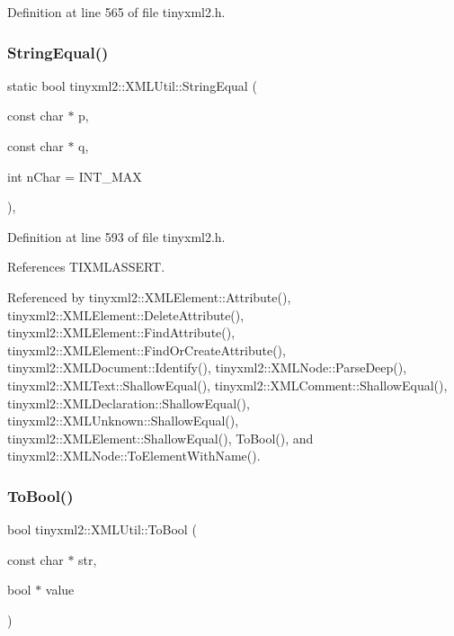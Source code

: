 Definition at line 565 of file tinyxml2.\+h.

\mbox{\label{classtinyxml2_1_1_x_m_l_util_acfcd287cacfd2533e1bc9ea4dfb56602}} 
\subsubsection{StringEqual()}
{\footnotesize\ttfamily static bool tinyxml2\+::\+X\+M\+L\+Util\+::\+String\+Equal (\begin{DoxyParamCaption}\item[{const char $\ast$}]{p,  }\item[{const char $\ast$}]{q,  }\item[{int}]{n\+Char = {\ttfamily INT\+\_\+MAX} }\end{DoxyParamCaption})\hspace{0.3cm}{\ttfamily [inline]}, {\ttfamily [static]}}



Definition at line 593 of file tinyxml2.\+h.



References T\+I\+X\+M\+L\+A\+S\+S\+E\+RT.



Referenced by tinyxml2\+::\+X\+M\+L\+Element\+::\+Attribute(), tinyxml2\+::\+X\+M\+L\+Element\+::\+Delete\+Attribute(), tinyxml2\+::\+X\+M\+L\+Element\+::\+Find\+Attribute(), tinyxml2\+::\+X\+M\+L\+Element\+::\+Find\+Or\+Create\+Attribute(), tinyxml2\+::\+X\+M\+L\+Document\+::\+Identify(), tinyxml2\+::\+X\+M\+L\+Node\+::\+Parse\+Deep(), tinyxml2\+::\+X\+M\+L\+Text\+::\+Shallow\+Equal(), tinyxml2\+::\+X\+M\+L\+Comment\+::\+Shallow\+Equal(), tinyxml2\+::\+X\+M\+L\+Declaration\+::\+Shallow\+Equal(), tinyxml2\+::\+X\+M\+L\+Unknown\+::\+Shallow\+Equal(), tinyxml2\+::\+X\+M\+L\+Element\+::\+Shallow\+Equal(), To\+Bool(), and tinyxml2\+::\+X\+M\+L\+Node\+::\+To\+Element\+With\+Name().

\mbox{\label{classtinyxml2_1_1_x_m_l_util_ae5b03e0a1ca5d42052a7ac540f7aa12a}} 
\subsubsection{ToBool()}
{\footnotesize\ttfamily bool tinyxml2\+::\+X\+M\+L\+Util\+::\+To\+Bool (\begin{DoxyParamCaption}\item[{const char $\ast$}]{str,  }\item[{bool $\ast$}]{value }\end{DoxyParamCaption})\hspace{0.3cm}{\ttfamily [static]}}



